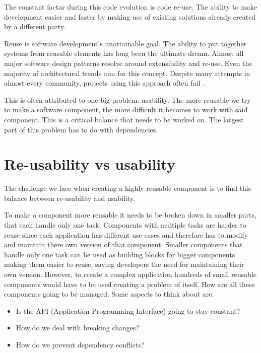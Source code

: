 The constant factor during this code evolution is code re-use. The ability to make development easier and faster by making use of existing solutions already created by a different party.

Reuse is software development’s unattainable goal. The ability to put together systems from reusable elements has long been the ultimate dream. Almost all major software design patterns resolve around extensibility and re-use. Even the majority of architectural trends aim for this concept. Despite many attempts in almost every community, projects using this approach often fail~\cite{reusedreamdead}.



This is often attributed to one big problem: usability. The more reusable we try to make a software component, the more difficult it becomes to work with said component. This is a critical balance that needs to be worked on. The largest part of this problem has to do with dependencies.


\section{Re-usability vs usability}
The challenge we face when creating a highly reusable component is to find this balance between re-usability and usability.

To make a component more reusable it needs to be broken down in smaller parts, that each handle only one task. Components with multiple tasks are harder to reuse since each application has different use cases and therefore has to modify and maintain there own version of that component. Smaller components that handle only one task can be used as building blocks for bigger components making them easier to reuse, saving developers the need for maintaining their own version. However, to create a complex application hundreds of small reusable components would have to be used creating a problem of itself. How are all these components going to be managed. Some aspects to think about are:
\begin{itemize}
	\item Is the API (Application Programming Interface) going to stay constant?
	\item How do we deal with breaking changes?
	\item How do we prevent dependency conflicts?
\end{itemize}

